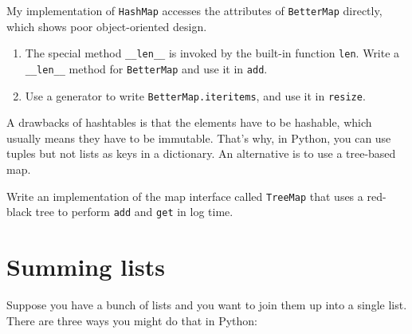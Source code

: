 \documentclass[10pt]{book}
\begin{document}
\begin{exercise}

My implementation of {\tt HashMap} accesses the attributes of
{\tt BetterMap} directly, which shows poor object-oriented design.

\begin{enumerate}

\item The special method \verb"__len__" is invoked by the built-in
function {\tt len}.  Write a \verb"__len__" method for {\tt BetterMap}
and use it in {\tt add}.

\item Use a generator to write {\tt BetterMap.iteritems}, and use it
in {\tt resize}.

\end{enumerate}

\end{exercise}


\begin{exercise}

A drawbacks of hashtables is that the elements have to be hashable,
which usually means they have to be immutable.  That's why, in Python,
you can use tuples but not lists as keys in a dictionary.  An
alternative is to use a tree-based map.

Write an implementation of the map interface called
{\tt TreeMap} that uses a red-black tree to perform {\tt add}
and {\tt get} in log time.

\end{exercise}



\section{Summing lists}
\label{growth_experiment}

Suppose you have a bunch of lists and you want to join them up
into a single list.  There are three ways you might do that
in Python:
\end{document}
